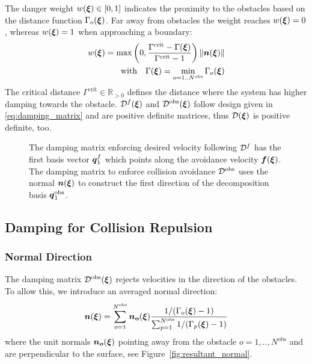 The danger weight $w(\boldsymbol{\xi}) \in [0, 1]$ indicates the proximity to the obstacles based on the distance function $\Gamma_o(\boldsymbol{\xi})$. Far away from obstacles the weight reaches $w(\boldsymbol{\xi}) = 0$, whereas $w(\boldsymbol{\xi}) = 1$ when approaching a boundary:
\begin{equation}
  \begin{split}
w(\vecs\xi) =
\max \left(0,  \frac{\Gamma^{\mathrm{crit}} - \Gamma(\vecs\xi)}{\Gamma^{\mathrm{crit}} - 1} \right) \| \vecs n(\vecs \xi) \| \\
\text{with} \quad
\Gamma(\vecs\xi) = \min_{o = 1..N^{\mathrm{obs}}} \Gamma_o(\vecs\xi)
\label{eq:weight_function}
\end{split}
\end{equation}
The critical distance $\Gamma^{\mathrm{crit}} \in \mathbb{R}_{>0}$ defines the distance where the system has higher damping towards the obstacle.
${\mathcal{D}^f}(\boldsymbol{\xi})$ and $\mathcal{D^{\mathrm{obs}}}(\boldsymbol{\xi})$ follow design given in \eqref{eq:damping_matrix} and are positive definite matrices, thus $\mathcal{D}(\boldsymbol{\xi})$ is positive definite, too.

\begin{figure}
  \center
  
\caption{The damping matrix enforcing desired velocity following $\mathcal{D}^{f}$ has the first basis vector $\boldsymbol{q}_1^{f}$ which points along the avoidance velocity $\boldsymbol{f}(\boldsymbol{\xi})$. The damping matrix to enforce collision avoidance $\mathcal{D}^{\mathrm{obs}}$ uses the normal $\boldsymbol{n}(\boldsymbol{\xi})$ to construct the first direction of the decomposition basis $\boldsymbol{q}^{\mathrm{obs}}_1$.}
\label{fig:damping_basis_construction}
\end{figure}

\subsection{Damping for Collision Repulsion} \label{sec:obstacle_repulsion}

\subsubsection{Normal Direction}
The damping matrix $\mathcal{D}^{\mathrm{obs}}(\boldsymbol{\xi})$ rejects velocities in the direction of the obstacles. To allow this, we introduce an averaged normal direction:
\begin{equation}
  \vecs n(\vecs\xi) = \sum_{o=1}^{N^{\mathrm{obs}}} \vecs{n_o}(\vecs\xi)
  \frac{1 / (\Gamma_o(\vecs \xi) - 1)}{\sum_{p=1}^{N^\mathrm{obs}} 1 / (\Gamma_p(\vecs \xi) - 1)}
  \label{eq:averaged_normal}
\end{equation}
 where the unit normals $\boldsymbol{n_o} (\boldsymbol{\xi})$ pointing away from the obstacle $o = 1,  ..,  N^{\mathrm{obs}}$ and are perpendicular to the surface, see Figure~\ref{fig:resultant_normal}. 

